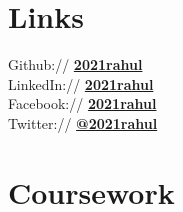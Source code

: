 \documentclass[]{deedy-resume-openfont}
\begin{document}
\begin{minipage}[t]{0.33\textwidth}

\section{Links} 
Github:// \href{https://github.com/2021rahul}{\bf 2021rahul} \\
LinkedIn://  \href{https://www.linkedin.com/in/2021rahul}{\bf 2021rahul} \\
Facebook:// \href{https://www.facebook.com/2021rahul}{\bf 2021rahul} \\
Twitter://  \href{https://twitter.com/2021rahul}{\bf @2021rahul} \\


\section{Coursework}


\end{minipage}
\end{document}
